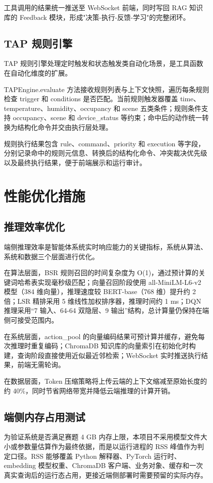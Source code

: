 \documentclass[12pt,a4paper,oneside]{ctexrep}
\begin{document}
\begin{figure}[H]
工具调用的结果统一推送至 WebSocket 前端，同时写回 RAG 知识库的 Feedback 模块，形成"决策-执行-反馈-学习"的完整闭环。

\section{TAP 规则引擎}

TAP 规则引擎处理定时触发和状态触发类自动化场景，是工具函数在自动化维度的扩展。

TAPEngine.evaluate 方法接收规则列表与上下文快照，遍历每条规则检查 trigger 和 conditions 是否匹配。当前规则触发器覆盖 time、temperature、humidity、occupancy 和 scene 五类条件；规则条件支持 occupancy、scene 和 device\_status 等约束；命中后的动作统一转换为结构化命令并交由执行层处理。

规则执行结果包含 rule、command、priority 和 execution 等字段，分别记录命中的规则元信息、转换后的结构化命令、冲突裁决优先级以及最终执行结果，便于前端展示和运行审计。

\chapter{性能优化措施}

\section{推理效率优化}

端侧推理效率是智能体系统实时响应能力的关键指标，系统从算法、系统和数据三个层面进行优化。

在算法层面，BSR 规则召回的时间复杂度为 O(1)，通过预计算的关键词哈希表实现毫秒级匹配；向量召回阶段使用 all-MiniLM-L6-v2 模型（384 维向量），推理速度较 BERT-base（768 维）提升约 2 倍；LSR 精排采用 5 维线性加权排序器，推理时间约 1 ms；DQN 推理采用“7 输入、64-64 双隐层、9 输出”结构，总计算量仍保持在端侧可接受范围内。

在系统层面，action\_pool 的向量编码结果可预计算并缓存，避免每次推理时重复编码；ChromaDB 知识库的向量索引在初始化时构建，查询阶段直接使用近似最近邻检索；WebSocket 实时推送执行结果，前端无需轮询。

在数据层面，Token 压缩策略将上传云端的上下文缩减至原始长度的约 40\%，同时节省网络带宽并降低云端推理的计算开销。

\section{端侧内存占用测试}

为验证系统是否满足赛题 4 GB 内存上限，本项目不采用模型文件大小或参数量估算作为最终依据，而是以运行进程的 RSS 峰值作为判定口径。RSS 能够覆盖 Python 解释器、PyTorch 运行时、embedding 模型权重、ChromaDB 客户端、业务对象、缓存和一次真实查询后的运行态占用，更接近端侧部署时需要预留的实际内存。


\end{figure}
\end{document}
